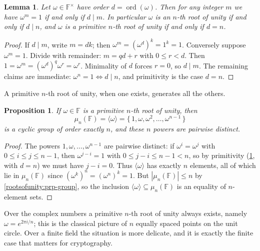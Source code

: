 \documentclass[11pt,a4paper]{article}
\newtheorem{lemma}[theorem]{Lemma}
\newtheorem{proposition}[theorem]{Proposition}
\theoremstyle{definition}
\theoremstyle{remark}
\newcommand{\F}{\ensuremath{\mathbb{F}}}
\DeclareMathOperator{\ord}{ord}
\begin{document}
\begin{lemma}\label{rootsofunity:lem-orderdivides}
Let \(\omega \in \F^\times\) have order \(d = \ord(\omega)\). Then for any integer \(m\) we have \(\omega^m = 1\) if and only if \(d \mid m\). In particular \(\omega\) is an \(n\)-th root of unity if and only if \(d \mid n\), and \(\omega\) is a \emph{primitive} \(n\)-th root of unity if and only if \(d = n\).
\end{lemma}

\begin{proof}
If \(d \mid m\), write \(m = dk\); then \(\omega^m = (\omega^d)^k = 1^k = 1\). Conversely suppose \(\omega^m = 1\). Divide with remainder: \(m = qd + r\) with \(0 \le r < d\). Then \(1 = \omega^m = (\omega^d)^q \omega^r = \omega^r\). Minimality of \(d\) forces \(r = 0\), so \(d \mid m\). The remaining claims are immediate: \(\omega^n = 1 \iff d \mid n\), and primitivity is the case \(d = n\).
\end{proof}

A primitive \(n\)-th root of unity, when one exists, generates all the others.

\begin{proposition}\label{rootsofunity:prp-cyclic}
If \(\omega \in \F\) is a primitive \(n\)-th root of unity, then
\[
  \mu_n(\F) = \langle \omega \rangle = \{\,1, \omega, \omega^2, \dots, \omega^{n-1}\,\}
\]
is a cyclic group of order exactly \(n\), and these \(n\) powers are pairwise distinct.
\end{proposition}

\begin{proof}
The powers \(1, \omega, \dots, \omega^{n-1}\) are pairwise distinct: if \(\omega^i = \omega^j\) with \(0 \le i \le j \le n-1\), then \(\omega^{j-i} = 1\) with \(0 \le j - i \le n-1 < n\), so by primitivity (\cref{rootsofunity:lem-orderdivides}, with \(d = n\)) we must have \(j - i = 0\). Thus \(\langle \omega \rangle\) has exactly \(n\) elements, all of which lie in \(\mu_n(\F)\) since \((\omega^k)^n = (\omega^n)^k = 1\). But \(|\mu_n(\F)| \le n\) by \cref{rootsofunity:prp-group}, so the inclusion \(\langle\omega\rangle \subseteq \mu_n(\F)\) is an equality of \(n\)-element sets.
\end{proof}

Over the complex numbers a primitive \(n\)-th root of unity always exists, namely \(\omega = e^{2\pi i / n}\); this is the classical picture of \(n\) equally spaced points on the unit circle. Over a finite field the situation is more delicate, and it is exactly the finite case that matters for cryptography.
\end{document}
